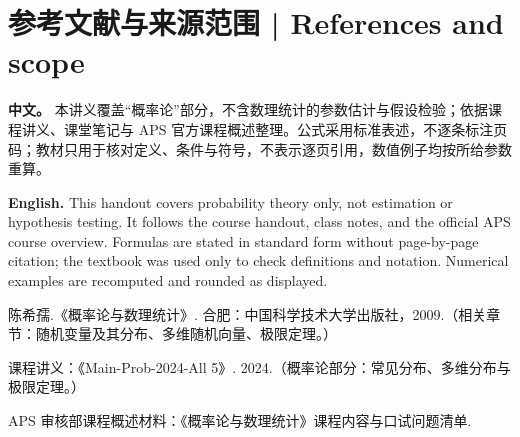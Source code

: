 \documentclass[UTF8,11pt,a4paper]{ctexart}
\newcommand{\APS}[2]{\par\noindent\textbf{中文。} #1\par\noindent\textbf{English.} #2\par\smallskip}
\begin{document}
\section*{参考文献与来源范围 | References and scope}
\APS{本讲义覆盖“概率论”部分，不含数理统计的参数估计与假设检验；依据课程讲义、课堂笔记与 APS 官方课程概述整理。公式采用标准表述，不逐条标注页码；教材只用于核对定义、条件与符号，不表示逐页引用，数值例子均按所给参数重算。}{This handout covers probability theory only, not estimation or hypothesis testing. It follows the course handout, class notes, and the official APS course overview. Formulas are stated in standard form without page-by-page citation; the textbook was used only to check definitions and notation. Numerical examples are recomputed and rounded as displayed.}

\begin{enumerate}[label={[\arabic*]},leftmargin=1.8em,itemsep=0pt,topsep=1pt]
\item 陈希孺.《概率论与数理统计》. 合肥：中国科学技术大学出版社，2009.（相关章节：随机变量及其分布、多维随机向量、极限定理。）
\item 课程讲义：《Main-Prob-2024-All 5》. 2024.（概率论部分：常见分布、多维分布与极限定理。）
\item APS 审核部课程概述材料：《概率论与数理统计》课程内容与口试问题清单.
\end{enumerate}
\end{document}
